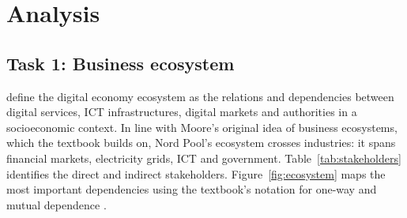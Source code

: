 \section{Analysis}
\label{sec:analysis}

\subsection{Task 1: Business ecosystem}
\label{sec:t1}

\citet[Def.~4.1]{OverbyAudestad2021} define the digital economy ecosystem as the relations and dependencies between digital services, ICT infrastructures, digital markets and authorities in a socioeconomic context. In line with Moore's original idea of business ecosystems, which the textbook builds on, Nord Pool's ecosystem crosses industries: it spans financial markets, electricity grids, ICT and government. Table~\ref{tab:stakeholders} identifies the direct and indirect stakeholders. Figure~\ref{fig:ecosystem} maps the most important dependencies using the textbook's notation for one-way and mutual dependence \citep[Fig.~4.3]{OverbyAudestad2021}.

